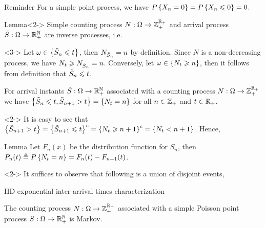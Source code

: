 \documentclass[12pt,aspectratio=169]{beamer}
\begin{document}
\begin{frame}
\begin{block}{Reminder} 
For a simple point process, we have
$P\left\{X_{n} = 0\right\} = P\left\{X_n\leqslant 0\right\} = 0.$
\end{block}
\begin{block}{Lemma}<2-> 
Simple counting process $N:\Omega\to\mathbb{Z}_+^{\mathbb{R}_+}$ and arrival process $\tilde{S}:\Omega\to\mathbb{R}_+^{\mathbb{N}}$ are inverse processes, i.e. 
\end{block}
\begin{Proof}<3-> 
Let $\omega \in \left\{\tilde{S}_n \leqslant t\right\}$, then $N_{\tilde{S}_n} = n$ by definition. 
Since $N$ is a non-decreasing process, we have $N_t \geqslant N_{\tilde{S}_n} = n$. 
Conversely, let $\omega \in \left\{N_t \geqslant n\right\}$, then it follows from definition that $\tilde{S}_n \leqslant t$.
\end{Proof}
\end{frame}


\begin{frame}
\begin{cor} 
For arrival instants $\tilde{S}:\Omega\to\mathbb{R}_+^{\mathbb{N}}$ associated with a counting process $N:\Omega\to\mathbb{Z}_+^{\mathbb{R}_+}$ 
we have 
$
\left\{\tilde{S}_n \leqslant t, \tilde{S}_{n+1} > t\right\} = \left\{N_t = n\right\} 
$
for all $n \in \mathbb{Z}_+$ and $t \in \mathbb{R}_+$. 
\end{cor}
\begin{Proof}<2->
It is easy to see that 
$\left\{\tilde{S}_{n+1} > t \right\} = \left\{\tilde{S}_{n+1} \leqslant t\right\}^c = \left\{N_t \geqslant n+1\right\}^c = \left\{N_t < n+1\right\}$.
Hence, %
\end{Proof}
\end{frame}


\begin{frame}
\begin{block}{Lemma}
Let $F_n(x)$ be the distribution function for $S_n$, then 
$P_n(t) \triangleq P\left\{N_t = n\right\} = F_{n}(t)-F_{n+1}(t)$. 
\end{block}

\begin{Proof}<2->
It suffices to observe that following is a union of disjoint events,
\end{Proof}
\end{frame}





\begin{frame}{IID exponential inter-arrival times characterization}

\begin{prop} 
The counting process $N:\Omega\to\mathbb{Z}_+^{\mathbb{R}_+}$ 
associated with a simple Poisson point process $S:\Omega\to\mathbb{R}_+^{\mathbb{N}}$ 
is Markov. 
\end{prop}
\end{frame}
\end{document}
